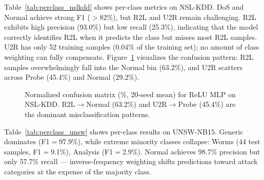 \documentclass[10pt,twocolumn]{article}
\begin{document}
Table~\ref{tab:perclass_nslkdd} shows per-class metrics on NSL-KDD.
DoS and Normal achieve strong F1 ($>82$\%), but R2L and U2R remain
challenging. R2L exhibits high precision (93.0\%) but low recall
(25.3\%), indicating that the model correctly identifies R2L when it
predicts the class but misses most R2L samples.
U2R has only 52 training samples (0.04\% of the training set);
no amount of class weighting can fully compensate.
Figure~\ref{fig:cm_nslkdd} visualizes the confusion pattern:
R2L samples overwhelmingly fall into the Normal bin (63.2\%),
and U2R scatters across Probe (45.4\%) and Normal (29.2\%).

\begin{figure}[t]
\centering
{}
\caption{Normalized confusion matrix (\%, 20-seed mean) for ReLU MLP
on NSL-KDD. R2L$\to$Normal (63.2\%) and U2R$\to$Probe (45.4\%) are
the dominant misclassification patterns.}
\label{fig:cm_nslkdd}
\end{figure}

Table~\ref{tab:perclass_unsw} shows per-class results on UNSW-NB15.
Generic dominates (F1$=$97.9\%), while extreme minority classes
collapse: Worms (44 test samples, F1$=$9.1\%), Analysis (F1$=$2.9\%).
Normal achieves 98.7\% precision but only 57.7\% recall ---
inverse-frequency weighting shifts predictions toward attack
categories at the expense of the majority class.
\end{document}
